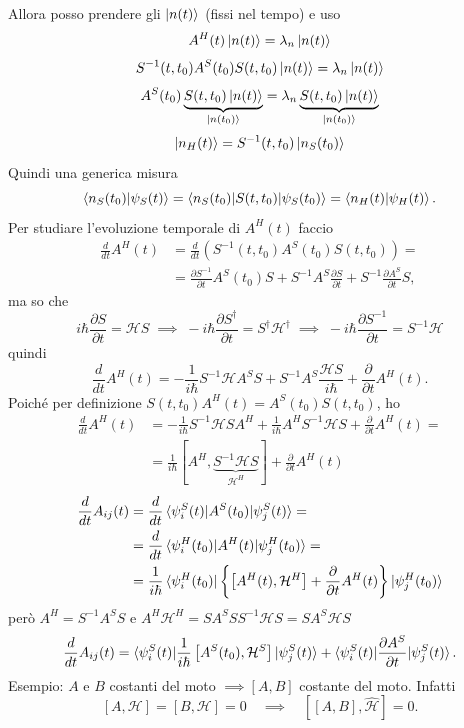 \bigskip
\noindent
Allora posso prendere gli \( \ket{n(t)} \) (fissi nel tempo) e uso
\[
A^H(t) \ket{n(t)} = \lambda_n \ket{n(t)}
\]
\[
S^{-1}(t, t_0) A^S(t_0) S(t, t_0) \ket{n(t)} = \lambda_n \ket{n(t)}
\]
\[
A^S(t_0) \underbrace{S(t, t_0) \ket{n(t)}}_{\ket{n(t_0)}} = \lambda_n \underbrace{S(t, t_0) \ket{n(t)}}_{\ket{n(t_0)}}
\]
\[
\ket{n_H(t)} = S^{-1}(t, t_0) \ket{n_S(t_0)}
\]
Quindi una generica misura
\[
\braket{n_S(t_0)|\psi_S(t)} = \braket{n_S(t_0)|S(t, t_0)|\psi_S(t_0)} = \braket{n_H(t)|\psi_H(t)}.
\]
Per studiare l'evoluzione temporale di \( A^H(t) \) faccio
\begin{align*}
\frac{d}{dt} A^H(t) &= \frac{d}{dt} \left( S^{-1}(t, t_0) A^S(t_0) S(t, t_0) \right) = \\
&= \frac{\partial S^{-1}}{\partial t} A^S(t_0) S + S^{-1} A^S \frac{\partial S}{\partial t} + S^{-1} \frac{\partial A^S}{\partial t} S,
\end{align*}
ma so che
\[
i \hbar \frac{\partial S}{\partial t} = \mathcal{H} S \; \implies \; -i \hbar \frac{\partial S^\dag}{\partial t} = S^\dag \mathcal{H}^\dag \; \implies \; -i \hbar \frac{\partial S^{-1}}{\partial t} = S^{-1} \mathcal{H}
\]
quindi 
\[
\frac{d}{dt} A^H(t) = -\frac{1}{i \hbar} S^{-1} \mathcal{H} A^S S + S^{-1} A^S \frac{\mathcal{H} S}{i \hbar} + \frac{\partial}{\partial t} A^H(t).
\]
Poiché per definizione \( S(t, t_0) A^H(t) = A^S(t_0) S(t, t_0) \), ho
\begin{align*}
\frac{d}{dt} A^H(t) &= -\frac{1}{i \hbar} S^{-1} \mathcal{H} S A^H + \frac{1}{i \hbar} A^H S^{-1} \mathcal{H} S + \frac{\partial}{\partial t} A^H(t) = \\
&= \frac{1}{i \hbar} \left[ A^H, \underbrace{S^{-1} \mathcal{H} S}_{\mathcal{H}^H} \right] + \frac{\partial}{\partial t} A^H(t)
\end{align*}
\begin{align*}
\frac{d}{dt} A_{ij}(t) &= \frac{d}{dt} \braket{\psi_i^S(t)|A^S(t_0)|\psi_j^S(t)} = \\
&= \frac{d}{dt} \braket{\psi_i^H(t_0)|A^H(t)|\psi_j^H(t_0)} = \\
&= \frac{1}{i \hbar} \braket{\psi_i^H(t_0)|\left\{ \left[ A^H(t), \mathcal{H}^H \right] + \frac{\partial}{\partial t} A^H(t) \right\}|\psi_j^H(t_0)}
\end{align*}
però \( A^H = S^{-1} A^S S \) e \( A^H \mathcal{H}^H = S A^S S S^{-1} \mathcal{H} S = S A^S \mathcal{H} S \)
\[
\frac{d}{dt} A_{ij}(t) = \braket{\psi_i^S(t)|\frac{1}{i \hbar} \left[ A^S(t_0), \mathcal{H}^S \right]|\psi_j^S(t)} + \braket{\psi_i^S(t)|\frac{\partial A^S}{\partial t}|\psi_j^S(t)}.
\]
Esempio: \( A \) e \( B \) costanti del moto \( \implies [A, B] \) costante del moto. Infatti
\[
[A, \mathcal{H}] = [B, \mathcal{H}] = 0 \quad \implies \quad \left[ [A, B], \hat{\mathcal{H}} \right] = 0.
\]
